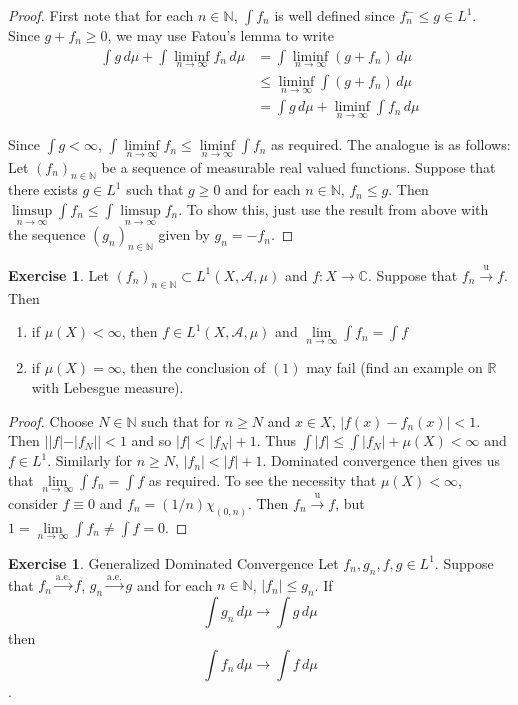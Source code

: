 \documentclass{book}
\theoremstyle{definition}
\newtheorem{ex}[definition]{Exercise}
\newcommand{\C}{\mathbb{C}}
\newcommand{\N}{\mathbb{N}}
\newcommand{\R}{\mathbb{R}}
\newcommand{\MA}{\mathcal{A}}
\newcommand{\lex}[1]{\label{ex:#1}}
\DeclareMathOperator*{\0}{\mbf{0}}
\DeclareMathOperator*{\1}{\mbf{1}}
\newcommand{\limfn}{\liminf \limits_{n \rightarrow \infty}}
\newcommand{\limpn}{\limsup \limits_{n \rightarrow \infty}}
\newcommand{\limn}{\lim \limits_{n \rightarrow \infty}}
\newcommand{\dmu}{\, d \mu}
\begin{document}
	\begin{proof}
		First note that for each $n \in \N$, $\int f_n$ is well defined since $f_n^- \leq g \in L^1$. Since $g + f_n \geq 0$, we may use Fatou's lemma to write
		\begin{align*}
			\int g \dmu + \int \limfn f_n \dmu 
			&= \int \limfn (g+f_n)  \dmu \\
			& \leq \limfn \int (g + f_n) \dmu \\
			&= \int g \dmu + \limfn \int f_n \dmu 
		\end{align*}
		
		Since $\int g < \infty$, $\int \limfn f_n \leq \limfn \int f_n$ as required. The analogue is as follows: Let $(f_n)_{n \in \N}$ be a sequence of measurable real valued functions. Suppose that there exists $g \in L^1$ such that $g \geq 0$ and for each $n \in \N$, $f_n \leq g$. Then $\limpn \int f_n \leq \int \limpn f_n$. To show this, just use the result from above with the sequence $(g_n)_{n \in \N}$ given by $g_n = -f_n$.
		
	\end{proof}
	
	\begin{ex} \lex{00000} 
		Let $(f_n)_{n \in \N} \subset L^1(X, \MA, \mu)$ and $f:X \rightarrow \C$. Suppose that $f_n \xrightarrow{\text{u}} f$. Then 
		\begin{enumerate}
			\item if $\mu(X) < \infty$, then $f \in L^1(X, \MA, \mu)$ and $\limn \int f_n = \int f$
			\item if $\mu(X) = \infty$, then the conclusion of $(1)$ may fail (find an example on $\R$ with Lebesgue measure).
		\end{enumerate}
	\end{ex}
	
	\begin{proof}
		Choose $N \in \N$ such that for $n \geq N$ and $x \in X$, $|f(x) - f_n(x)| < 1$. Then $||f| - |f_N|| < 1$ and so $|f| < |f_N| +1$. Thus $\int |f| \leq \int |f_N| +\mu(X) < \infty$ and $f \in L^1$. Similarly for $n \geq N$, $|f_n| < |f|+ 1$. Dominated convergence then gives us that $\limn \int f_n = \int f$ as required. To see the necessity that $\mu(X) < \infty$, consider $f \equiv 0$ and $f_n = (1/n) \chi_{(0,n)}$. Then $f_n \xrightarrow{\text{u}} f$, but $1 = \limn \int f_n \neq \int f = 0$.  
	\end{proof}
	
	\begin{ex} \lex{00000} {Generalized Dominated Convergence}
		Let $f_n,g_n,f,g \in L^1$. Suppose that $f_n \xrightarrow{\text{a.e.}} f$, $g_n \xrightarrow{\text{a.e.}} g$ and for each $n \in \N$, $|f_n| \leq g_n$. If $$\int g_n \dmu \rightarrow \int g \dmu $$ then $$\int f_n \dmu \rightarrow \int f \dmu$$.
	\end{ex}
	
\end{document}
